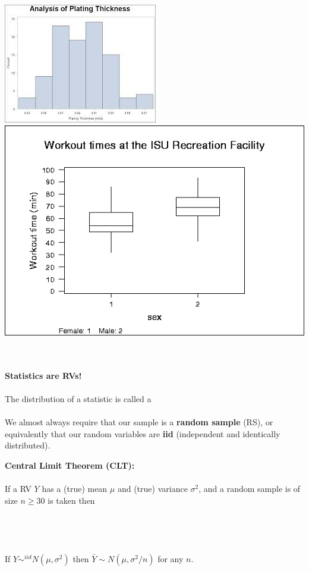 \begin{center}
\includegraphics[scale=1]{histogram}~~~~~~~~~~~\includegraphics[scale=0.5]{boxplot}
\end{center}

~\\~\\
\Large \textbf{Statistics are RVs!}\large\\~\\
The distribution of a statistic is called a
\underbar{~~~~~~~~~~~~~~~~~~~~~~~~~~~~~~~~~~~~~~}\\~\\

We almost always require that our sample is a \textbf{random sample} (RS), or equivalently that our random variables are \textbf{iid} (independent and identically distributed).

\newpage

\textbf{Central Limit Theorem (CLT):}\\~\\
If a RV $Y$ has a (true) mean $\mu$ and (true) variance $\sigma^2$, and a random sample is of size $n\geq 30$ is taken then
\\~\\~\\~\\~\\
If $Y\sim^{iid} N(\mu,\sigma^2)$ then $\bar{Y}\sim N(\mu,\sigma^2/n)$ for any $n$.\\

